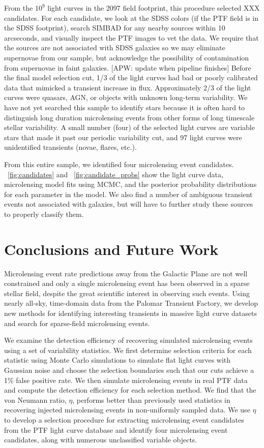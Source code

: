 \documentclass{emulateapj}
\newcommand{\apwsim}{\raisebox{0.2ex}{\scriptsize$\sim$\normalsize}}
\begin{document}
From the \apwsim$10^9$ light curves in the 2097 field footprint, this procedure selected XXX candidates. For each candidate, we look at the SDSS colors (if the PTF field is in the SDSS footprint), search SIMBAD for any nearby sources within 10 arcseconds, and visually inspect the PTF images to vet the data. We require that the sources are not associated with SDSS galaxies so we may eliminate supernovae from our sample, but acknowledge the possibility of contamination from supernovae in faint galaxies. [APW: update when pipeline finishes] Before the final model selection cut, \apwsim1/3 of the light curves had bad or poorly calibrated data that mimicked a transient increase in flux. Approximately 2/3 of the light curves were quasars, AGN, or objects with unknown long-term variability. We have not yet searched this sample to identify stars because it is often hard to distinguish long duration microlensing events from other forms of long timescale stellar variability. A small number (four) of the selected light curves are variable stars that made it past our periodic variability cut, and 97 light curves were unidentified transients (novae, flares, etc.). 

From this entire sample, we identified four microlensing event candidates. \figurename~\ref{fig:candidates} and \figurename~\ref{fig:candidate_probs} show the light curve data, microlensing model fits using MCMC, and the posterior probability distributions for each parameter in the model. We also find a number of ambiguous transient events not associated with galaxies, but will have to further study these sources to properly classify them.

\section{Conclusions and Future Work}
Microlensing event rate predictions away from the Galactic Plane are not well constrained and only a single microlensing event has been observed in a sparse stellar field, despite the great scientific interest in observing such events. Using nearly all-sky, time-domain data from the Palomar Transient Factory, we develop new methods for identifying interesting transients in massive light curve datasets and search for sparse-field microlensing events. 

We examine the detection efficiency of recovering simulated microlensing events using a set of variability statistics. We first determine selection criteria for each statistic using Monte Carlo simulations to simulate flat light curves with Gaussian noise and choose the selection boundaries such that our cuts achieve a 1\% false positive rate. We then simulate microlensing events in real PTF data and compute the detection efficiency for each selection method. We find that the von Neumann ratio, $\eta$, performs better than previously used statistics in recovering injected microlensing events in non-uniformly sampled data. We use $\eta$ to develop a selection procedure for extracting microlensing event candidates from the PTF light curve database and identify four microlensing event candidates, along with numerous unclassified variable objects.
\end{document}
